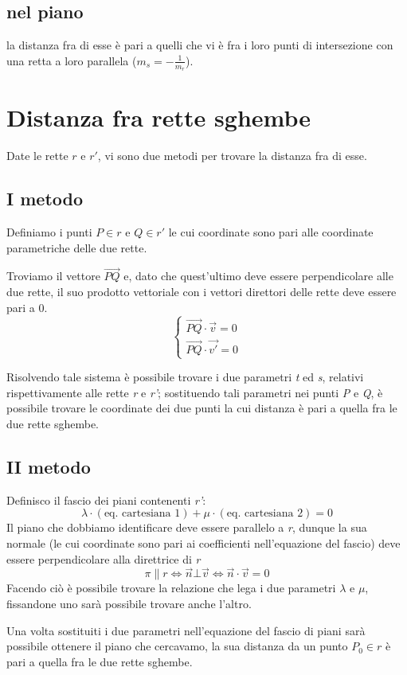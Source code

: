 		\subsection{nel piano}
			la distanza fra di esse è pari a quelli che vi è fra i loro punti di intersezione con una retta a loro parallela ($ m_s = - \frac{1}{m_r} $).
	
	\section{Distanza fra rette sghembe}
		Date le rette $r$ e $r'$, vi sono due metodi per trovare la distanza fra di esse.
		
		\subsection{I metodo}
			Definiamo i punti $P \in r$ e $Q \in r'$ le cui coordinate sono pari alle coordinate parametriche delle due rette.
			
			Troviamo il vettore $\overrightarrow{PQ}$ e, dato che quest'ultimo deve essere perpendicolare alle due rette, il suo prodotto vettoriale con i vettori direttori delle rette deve essere pari a 0.
			$$ \begin{cases}
				\overrightarrow{PQ} \cdot \vec{v} = 0 \\
				\overrightarrow{PQ} \cdot \vec{v'} = 0
			\end{cases}$$
		
			Risolvendo tale sistema è possibile trovare i due parametri \textit{t} ed \textit{s}, relativi rispettivamente alle rette \textit{r} e \textit{r'}; sostituendo tali parametri nei punti \textit{P} e \textit{Q}, è possibile trovare le coordinate dei due punti la cui distanza è pari a quella fra le due rette sghembe.
		
		\subsection{II metodo}
			Definisco il fascio dei piani contenenti \textit{r'}:
			$$ \lambda \cdot (\text{eq. cartesiana 1}) + \mu \cdot (\text{eq. cartesiana 2}) = 0 $$
			Il piano che dobbiamo identificare deve essere parallelo a \textit{r}, dunque la sua normale (le cui coordinate sono pari ai coefficienti nell'equazione del fascio) deve essere perpendicolare alla direttrice di \textit{r}
			$$ \pi \parallel r \iff \vec{n} \bot \vec{v} \iff \vec{n} \cdot \vec{v} = 0 $$
			Facendo ciò è possibile trovare la relazione che lega i due parametri $\lambda$ e $\mu$, fissandone uno sarà possibile trovare anche l'altro.
			
			Una volta sostituiti i due parametri nell'equazione del fascio di piani sarà possibile ottenere il piano che cercavamo, la sua distanza da un punto $P_0 \in r$ è pari a quella fra le due rette sghembe.